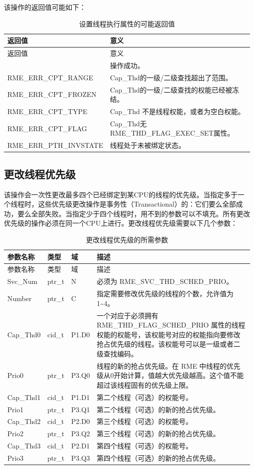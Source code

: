 该操作的返回值可能如下：

\begin{xltabular}{\textwidth}{@{}>{\hsize\raggedright\arraybackslash}X>{\hsize\raggedright\arraybackslash}X@{}}
\caption{设置线程执行属性的可能返回值}\label{tab:4-29-set-thread-execution-attributes-return-values}\\
\toprule
返回值 & 意义\tabularnewline
\endfirsthead
\toprule
返回值 & 意义\tabularnewline
\midrule
\endhead
\bottomrule
{} & 操作成功。\tabularnewline
    RME\_ERR\_CPT\_RANGE & Cap\_Thd的一级/二级查找超出了范围。\tabularnewline
    RME\_ERR\_CPT\_FROZEN & Cap\_Thd的一级/二级查找的权能已经被冻结。\tabularnewline
    RME\_ERR\_CPT\_TYPE & Cap\_Thd 不是线程权能，或者为空白权能。\tabularnewline
    RME\_ERR\_CPT\_FLAG & Cap\_Thd无RME\_THD\_FLAG\_EXEC\_SET属性。\tabularnewline
    RME\_ERR\_PTH\_INVSTATE & 线程处于未被绑定状态。\tabularnewline
\end{xltabular}

\subsection{更改线程优先级}\label{subsec:4-change-thread-priority}

该操作会一次性更改最多四个已经绑定到某CPU的线程的优先级。当指定多于一个线程时，这些优先级更改操作是事务性（Transactional）的：它们要么全部成功，要么全部失败。当指定少于四个线程时，用不到的参数可以不填充。所有更改优先级的操作必须在同一个CPU上进行。更改线程优先级需要以下几个参数：

\begin{xltabular}{\textwidth}{@{}>{\hsize\raggedright\arraybackslash}X>{\hsize\raggedright\arraybackslash}X>{\hsize\raggedright\arraybackslash}X>{\hsize\raggedright\arraybackslash}X@{}}
\caption{更改线程优先级的所需参数}\label{tab:4-30-change-thread-priority-parameters}\\
\toprule
参数名称 & 类型 & 域 & 描述\tabularnewline
\endfirsthead
\toprule
参数名称 & 类型 & 域 & 描述\tabularnewline
\midrule
\endhead
\bottomrule
\endlastfoot
Svc\_Num & ptr\_t & N & 必须为 RME\_SVC\_THD\_SCHED\_PRIO。\tabularnewline
Number & ptr\_t & C &
指定需要修改优先级的线程的个数，允许值为1\textasciitilde4。\tabularnewline
Cap\_Thd0 & cid\_t & P1.D0 &
一个对应于必须拥有 RME\_THD\_FLAG\_SCHED\_PRIO 属性的线程权能的权能号，该权能号对应的权能指向要修改抢占优先级的线程。该权能号可以是一级或者二级查找编码。\tabularnewline
Prio0 & ptr\_t & P3.Q0 &
线程的新的抢占优先级。在 RME 中线程的优先级从0开始计算，值越大优先级越高。这个值不能超过该线程固有的优先级上限。\tabularnewline
Cap\_Thd1 & cid\_t & P1.D1 & 第二个线程（可选）的权能号。\tabularnewline
Prio1 & ptr\_t & P3.Q1 &
第二个线程（可选）的新的抢占优先级。\tabularnewline
Cap\_Thd2 & cid\_t & P2.D0 & 第三个线程（可选）的权能号。\tabularnewline
Prio2 & ptr\_t & P3.Q2 &
第三个线程（可选）的新的抢占优先级。\tabularnewline
Cap\_Thd3 & cid\_t & P2.D1 & 第四个线程（可选）的权能号。\tabularnewline
Prio3 & ptr\_t & P3.Q3 &
第四个线程（可选）的新的抢占优先级。\tabularnewline
\end{xltabular}

